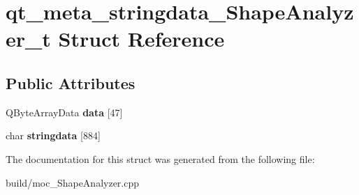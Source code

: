\hypertarget{structqt__meta__stringdata___shape_analyzer__t}{}\section{qt\+\_\+meta\+\_\+stringdata\+\_\+\+Shape\+Analyzer\+\_\+t Struct Reference}
\label{structqt__meta__stringdata___shape_analyzer__t}
\subsection*{Public Attributes}
\begin{DoxyCompactItemize}
\item 
\hypertarget{structqt__meta__stringdata___shape_analyzer__t_aeadd5420a13bcc874f70b954153006e2}{}Q\+Byte\+Array\+Data {\bfseries data} \mbox{[}47\mbox{]}\label{structqt__meta__stringdata___shape_analyzer__t_aeadd5420a13bcc874f70b954153006e2}

\item 
\hypertarget{structqt__meta__stringdata___shape_analyzer__t_addf8dd21ca8dafa4f3095ce93fc65b8b}{}char {\bfseries stringdata} \mbox{[}884\mbox{]}\label{structqt__meta__stringdata___shape_analyzer__t_addf8dd21ca8dafa4f3095ce93fc65b8b}

\end{DoxyCompactItemize}


The documentation for this struct was generated from the following file\+:\begin{DoxyCompactItemize}
\item 
build/moc\+\_\+\+Shape\+Analyzer.\+cpp\end{DoxyCompactItemize}
